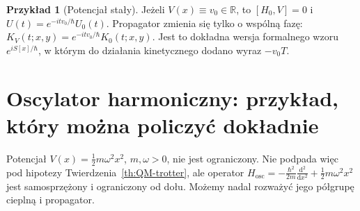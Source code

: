 \documentclass[11pt,a4paper,oneside]{report}
\numberwithin{equation}{chapter}
\theoremstyle{plain}
\theoremstyle{definition}
\newtheorem{przyklad}{Przykład}[chapter]
\theoremstyle{remark}
\newcommand{\R}{\mathbb{R}}
\newcommand{\dd}{\mathrm{d}}
\begin{document}
\begin{przyklad}[Potencjał stały]
Jeżeli $V(x)\equiv v_0\in\R$, to
$[H_0,V]=0$ i $U(t)=e^{-itv_0/\hbar}U_0(t)$.
Propagator zmienia się tylko o wspólną fazę:
$K_V(t;x,y)=e^{-itv_0/\hbar}K_0(t;x,y)$.
Jest to dokładna wersja formalnego wzoru
$e^{iS[x]/\hbar}$, w którym do działania
kinetycznego dodano wyraz $-v_0T$.
\end{przyklad}

\section{Oscylator harmoniczny: przykład, który można policzyć dokładnie}\label{sec:volIII:16:06}

Potencjał $V(x)=\frac12 m\omega^2x^2$, $m,\omega>0$,
nie jest ograniczony. Nie podpada więc pod hipotezy
Twierdzenia~\ref{th:QM-trotter}, ale operator
$H_{\mathrm{osc}}=-\frac{\hbar^2}{2m}\frac{\dd^2}{\dd x^2}
+\frac12m\omega^2x^2$ jest samosprzężony i
ograniczony od dołu. Możemy nadal rozważyć jego
półgrupę cieplną i propagator.
\end{document}
